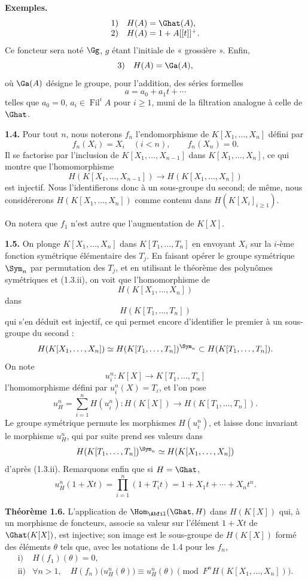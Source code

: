 \documentclass[11pt]{article}
\newcommand{\Fil}{\operatorname{Fil}}
\begin{document}
\textbf{Exemples.}
\[
\begin{array}{ll}
1)& H(A)=\Ghat(A),\\
2)& H(A)=1+A[[t]]^+.
\end{array}
\]
Ce foncteur sera noté \(\Gg\), \(g\) étant l'initiale de « grossière ». Enfin,
\[
3)\quad H(A)=\Ga(A),
\]
où \(\Ga(A)\) désigne le groupe, pour l'addition, des séries formelles
\[
  a=a_0+a_1t+\cdots
\]
telles que \(a_0=0\), \(a_i\in\Fil^i A\) pour \(i\geq 1\), muni de la filtration analogue à celle de \(\Ghat\).

\textbf{1.4.} Pour tout \(n\), nous noterons \(f_n\) l'endomorphisme de \(K[X_1,\ldots,X_n]\) défini par
\[
  f_n(X_i)=X_i\quad (i<n),\qquad f_n(X_n)=0.
\]
Il se factorise par l'inclusion de \(K[X_1,\ldots,X_{n-1}]\) dans \(K[X_1,\ldots,X_n]\), ce qui montre que l'homomorphisme
\[
  H(K[X_1,\ldots,X_{n-1}])\longrightarrow H(K[X_1,\ldots,X_n])
\]
est injectif. Nous l'identifierons donc à un sous-groupe du second; de même, nous considérerons \(H(K[X_1,\ldots,X_n])\) comme contenu dans \(H(K[X_i]_{i\geq 1})\).

On notera que \(f_1\) n'est autre que l'augmentation de \(K[X]\).

\textbf{1.5.} On plonge \(K[X_1,\ldots,X_n]\) dans \(K[T_1,\ldots,T_n]\) en envoyant \(X_i\) sur la \(i\)-ème fonction symétrique élémentaire des \(T_j\). En faisant opérer le groupe symétrique \(\Sym_n\) par permutation des \(T_j\), et en utilisant le théorème des polynômes symétriques et (1.3.ii), on voit que l'homomorphisme de
\[
  H(K[X_1,\ldots,X_n])
\]
dans
\[
  H(K[T_1,\ldots,T_n])
\]
qui s'en déduit est injectif, ce qui permet encore d'identifier le premier à un sous-groupe du second :
\[
  H(K[X_1,\ldots,X_n])\simeq H(K[T_1,\ldots,T_n])^{\Sym_n}
  \subset H(K[T_1,\ldots,T_n]).
\]
On note
\[
  u_i^n:K[X]\longrightarrow K[T_1,\ldots,T_n]
\]
l'homomorphisme défini par \(u_i^n(X)=T_i\), et l'on pose
\[
  u_H^n=\sum_{i=1}^n H(u_i^n):H(K[X])\longrightarrow H(K[T_1,\ldots,T_n]).
\]
Le groupe symétrique permute les morphismes \(H(u_i^n)\), et laisse donc invariant le morphisme \(u_H^n\), qui par suite prend ses valeurs dans
\[
  H(K[T_1,\ldots,T_n])^{\Sym_n}
  \simeq H(K[X_1,\ldots,X_n])
\]
d'après (1.3.ii). Remarquons enfin que si \(H=\Ghat\),
\[
  u_H^n(1+Xt)=\prod_{i=1}^n(1+T_it)=1+X_1t+\cdots+X_nt^n.
\]

\textbf{Théorème 1.6.} L'application de \(\Hom_{\Abfil}(\Ghat,H)\) dans \(H(K[X])\) qui, à un morphisme de foncteurs, associe sa valeur sur l'élément \(1+Xt\) de \(\Ghat(K[X])\), est injective; son image est le sous-groupe de \(H(K[X])\) formé des éléments \(\theta\) tels que, avec les notations de 1.4 pour les \(f_n\),
\[
\begin{array}{ll}
\text{i)}& H(f_1)(\theta)=0,\\[0.3em]
\text{ii)}& \forall n>1,\quad
H(f_n)\bigl(u_H^n(\theta)\bigr)\equiv u_H^n(\theta)
\pmod{F^nH(K[X_1,\ldots,X_n])}.
\end{array}
\]
\end{document}
